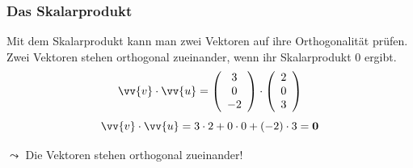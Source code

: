 \documentclass[a4paper, 15pt]{article}
\begin{document}
\subsubsection{Das Skalarprodukt}
\begin{minipage}{.49\textwidth}
Mit dem Skalarprodukt kann man zwei Vektoren auf ihre Orthogonalität prüfen. Zwei Vektoren stehen orthogonal zueinander, wenn ihr Skalarprodukt 0 ergibt.
\begin{equation*}
\vv{v} \cdot \vv{u} = \left(\begin{array}{c} 3 \\ 0 \\ -2 \end{array}\right) \cdot \left(\begin{array}{c} 2 \\ 0 \\ 3 \end{array}\right)
\end{equation*}
\begin{equation*}
\vv{v} \cdot \vv{u} = 3 \cdot 2 + 0 \cdot 0 + (-2) \cdot 3 = \mathbf{0}
\end{equation*}
\begin{center}
$\leadsto$ Die Vektoren stehen orthogonal zueinander!
\end{center}
\end{minipage}
\begin{minipage}{.49\textwidth}
\flushright
\begin{center}
\end{center}
\end{minipage}
\end{document}
